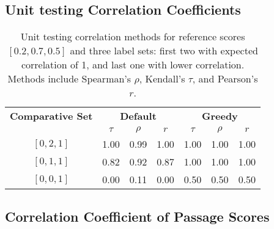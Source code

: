 \subsection{Unit testing Correlation Coefficients}\label{unit-testing-of-correlation-Coefficients}

\begin{table}[h!]
    \centering
    \caption{
        Unit testing correlation methods for reference scores $[0.2, 0.7, 0.5]$ and three label sets: first two with expected correlation of 1, and last one with lower correlation. Methods include Spearman's $\rho$, Kendall's $\tau$, and Pearson's $r$.
    }
    \begin{tabular}{ccccccc}
        \toprule
        \textbf{Comparative Set} & \multicolumn{3}{c}{\textbf{Default}} & \multicolumn{3}{c}{\textbf{Greedy}} \\
        \cmidrule(lr){2-4} \cmidrule(lr){5-7}
                                 & $\tau$ & $\rho$ & $r$ & $\tau$ & $\rho$ & $r$ \\
        \midrule
        
        $[0, 2, 1]$ & 1.00 & 0.99 & 1.00 & 1.00  & 1.00  & 1.00 \\
        $[0, 1, 1]$ & 0.82 & 0.92 & 0.87 & 1.00  & 1.00  & 1.00 \\
        $[0, 0, 1]$ & 0.00 & 0.11 & 0.00 & 0.50  & 0.50  & 0.50 \\
        \bottomrule
    \end{tabular}
\end{table}

\subsection{Correlation Coefficient of Passage Scores}\label{correlation-coefficient-of-passage-scores}

